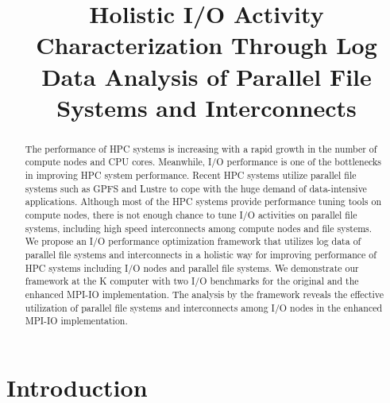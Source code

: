 \documentclass{jhps}
\begin{document}



\title{Holistic I/O Activity Characterization Through Log Data Analysis of Parallel File Systems and Interconnects}


\maketitle

\begin{abstract}
The performance of HPC systems is increasing with a rapid growth in the number of
compute nodes and CPU cores.
Meanwhile, I/O performance is one of the bottlenecks in improving HPC system performance.
Recent HPC systems utilize parallel file systems such as GPFS and Lustre
to cope with the huge demand of data-intensive applications.
Although most of the HPC systems provide performance tuning tools on compute nodes,
there is not enough chance to tune I/O activities on parallel file systems,
including high speed interconnects among compute nodes and file systems.
We propose an I/O performance optimization framework that utilizes log data of
parallel file systems and interconnects in a holistic way
for improving performance of HPC systems including I/O nodes and parallel file systems.
We demonstrate our framework at the K computer with two I/O benchmarks
for the original and the enhanced MPI-IO implementation.
The analysis by the framework reveals the effective utilization of parallel file systems
and interconnects among I/O nodes in the enhanced MPI-IO implementation.
\end{abstract}


\section{Introduction}
\end{document}
